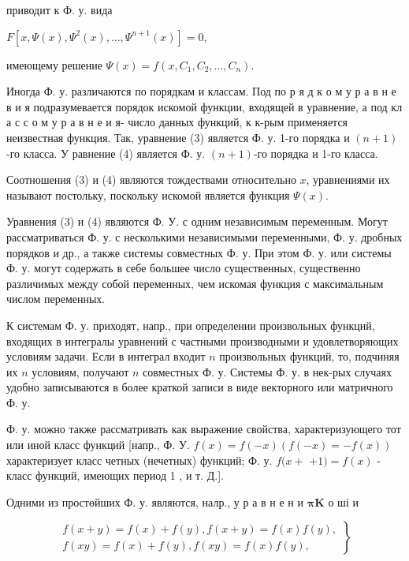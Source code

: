 \documentclass[10pt]{article}
\begin{document}
приводит к Ф. у. вида



$F\left[x, \Psi(x), \Psi^{2}(x), \ldots, \Psi^{n+1}(x)\right]=0$,



имеющему решение $\Psi(x)=f\left(x, C_{1}, C_{2}, \ldots, C_{n}\right)$.



Иногда Ф. у. различаются по порядкам и классам. Под по р я д к о м у р а в н е в и я подразумевается порядок искомой функции, входящей в уравнение, а под кл а с с о м у р а в н е и я- число данных функций, к к-рым применяется неизвестная функция. Так, уравнение (3) является Ф. у. 1-го порядка и $(n+1)$-го класса. У равнение (4) является Ф. у. $(n+1)$-го порядка и 1-го класса.



Соотношения (3) и (4) являются тождествами относительно $x$, уравнениями их называют постольку, поскольку искомой является функция $\Psi(x)$.



Уравнения (3) и (4) являются Ф. У. с одним независимым переменным. Могут рассматриваться $Ф$. у. с несколькими независимыми переменными, Ф. у. дробных порядков и др., а также системы совместных Ф. у. При этом Ф. у. или системы Ф. у. могут содержать в себе большее число существенных, существенно различимых между собой переменных, чем искомая функция с максимальным числом переменных.



К системам Ф. у. приходят, напр., при определении произвольных функций, входящих в интегралы уравнений с частными производными и удовлетворяющих условиям задачи. Если в интеграл входит $n$ произвольных функций, то, подчиняя их $n$ условиям, получают $n$ совместных Ф. у. Системы Ф. у. в нек-рых случаях удобно записываются в более краткой записи в виде векторного или матричного Ф. у.



Ф. у. можно также рассматривать как выражение свойства, характеризующего тот или иной класс функций [напр., Ф. У. $f(x)=f(-x)(f(-x)=-f(x))$ характеризует класс четных (нечетных) функций; Ф. у. $f(x+$ $+1)=f(x)$ - класс функций, имеющих период 1 , и т. Д.].



Одними из простөйших Ф. у. являются, налр., у р а в н е н и $\boldsymbol{\pi} \boldsymbol{K}$ о ші и



\[

\left.\begin{array}{l}

f(x+y)=f(x)+f(y), f(x+y)=f(x) f(y), \\

f(x y)=f(x)+f(y), f(x y)=f(x) f(y),

\end{array}\right\}

\]
\end{document}
